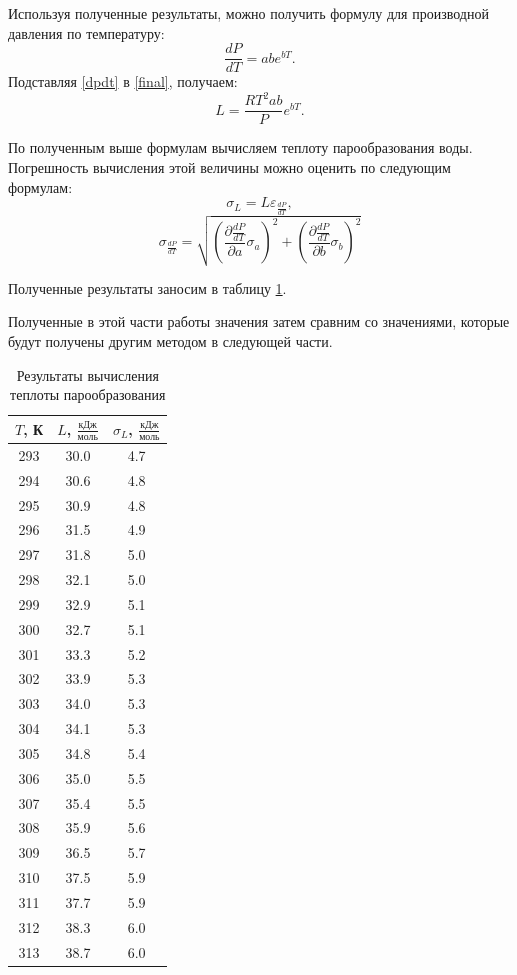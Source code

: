 \documentclass[12pt,a4paper]{article}
\begin{document}
Используя полученные результаты, можно получить формулу для производной давления по температуру: 
\begin{equation}\label{dpdt}
\frac{dP}{dT} = abe^{bT}.
\end{equation}
Подставляя \eqref{dpdt} в \eqref{final}, получаем:
\begin{equation}\label{newFinal}
L=\frac{RT^2ab}{P}e^{bT}.
\end{equation}

По полученным выше формулам вычисляем теплоту парообразования воды. Погрешность вычисления этой величины можно оценить по следующим формулам:
\[ \sigma_L = L\varepsilon_{\frac{dP}{dT}}, \]
\[ \sigma_{\frac{dP}{dT}} = \sqrt{\left(\frac{\partial\frac{dP}{dT}}{\partial a}\sigma_a\right)^2+\left(\frac{\partial\frac{dP}{dT}}{\partial b}\sigma_b\right)^2} \]

Полученные результаты заносим в таблицу \ref{tab:par}.

Полученные в этой части работы значения затем сравним со значениями, которые будут получены другим методом в следующей части.

\begin{table}[H]
	\centering
	\begin{tabular}{|c|c|c|}
	\hline
		$ T $, К & $ L $, $ \frac{\text{кДж}}{\text{моль}} $ & $ \sigma_L $, $ \frac{\text{кДж}}{\text{моль}} $ \\
		\hline
		293 & 30.0 & 4.7 \\ 
		\hline
		294 & 30.6 & 4.8 \\ 
		\hline 
		295 & 30.9 & 4.8 \\ 
		\hline 
		296 & 31.5 & 4.9 \\ 
		\hline 
		297 & 31.8 & 5.0 \\ 
		\hline 
		298 & 32.1 & 5.0 \\ 
		\hline 
		299 & 32.9 & 5.1 \\ 
		\hline 
		300 & 32.7 & 5.1 \\ 
		\hline 
		301 & 33.3 & 5.2 \\ 
		\hline 
		302 & 33.9 & 5.3 \\ 
		\hline
		303 & 34.0 & 5.3 \\ 
		\hline 
		304 & 34.1 & 5.3 \\ 
		\hline 
		305 & 34.8 & 5.4 \\ 
		\hline 
		306 & 35.0 & 5.5 \\ 
		\hline 
		307 & 35.4 & 5.5 \\ 
		\hline 
		308 & 35.9 & 5.6 \\ 
		\hline 
		309 & 36.5 & 5.7 \\ 
		\hline 
		310 & 37.5 & 5.9 \\ 
		\hline 
		311 & 37.7 & 5.9 \\ 
		\hline 
		312 & 38.3 & 6.0 \\ 
		\hline
		313 & 38.7 & 6.0 \\
		\hline 
	\end{tabular}
	\caption{Результаты вычисления теплоты парообразования}
	\label{tab:par}
\end{table}
\end{document}
